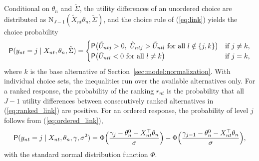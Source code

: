 \documentclass[article,shortnames]{jss}
\begin{document}
Conditional on $\theta_n$ and $\tilde{\Sigma}$, the utility differences of an
unordered choice are distributed as $\mathrm{N}_{J-1}(\tilde{X}_{nt} \theta_n,
\tilde{\Sigma})$, and the choice rule of (\ref{eq:link}) yields the
choice probability
%
\begin{equation}
  \label{eq:choice_probability}
  \mathsf{P}(y_{nt} = j \mid X_{nt}, \theta_n, \tilde{\Sigma}) =
  \begin{cases}
    \mathsf{P}\big(\tilde{U}_{ntj} > 0,\ \tilde{U}_{ntj} > \tilde{U}_{ntl} \
    \text{for all } l \notin \{j, k\}\big) & \text{if } j \neq k, \\
    \mathsf{P}\big(\tilde{U}_{ntl} < 0 \ \text{for all } l \neq k\big) & \text{if } j
    = k,
  \end{cases}
\end{equation}
%
where $k$ is the base alternative of Section~\ref{sec:model:normalization}.
With individual choice sets, the inequalities run over the available
alternatives only. For a ranked
response, the probability of the ranking $r_{nt}$ is the probability that all $J
- 1$ utility differences between consecutively ranked alternatives in
(\ref{eq:ranked_link}) are positive. For an ordered response, the
probability of level $j$ follows from (\ref{eq:ordered_link}),
%
\begin{equation}
  \label{eq:ordered_probability}
  \mathsf{P}(y_{nt} = j \mid X_{nt}, \theta_n, \gamma, \sigma^2) =
    \Phi\Big(\frac{\gamma_j - \theta_n^0 - X_{nt}^\top \theta_n}{\sigma}\Big) -
  \Phi\Big(\frac{\gamma_{j - 1} - \theta_n^0 - X_{nt}^\top
  \theta_n}{\sigma}\Big),
\end{equation}
%
with the standard normal distribution function $\Phi$.
\end{document}
